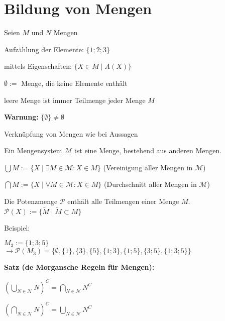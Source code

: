 \section*{Bildung von Mengen}
Seien $M$ und $N$ Mengen
\begin{compactitem}
	\item Aufzählung der Elemente: $\{1;2;3\}$
	\item mittels Eigenschaften: $\{X \in M \mid A(X)\}$
	\item $\emptyset:=$ Menge, die keine Elemente enthält
	\begin{compactitem}
		\item leere Menge ist immer Teilmenge jeder Menge $M$
		\item \textbf{Warnung:} $\{\emptyset\} \neq \emptyset$
	\end{compactitem}
	\item Verknüpfung von Mengen wie bei Aussagen
\end{compactitem}

\begin{mydef}[Mengensystem]
	Ein Mengensystem $\mathcal M$ ist eine Menge, bestehend aus anderen Mengen.
	\begin{compactitem}
		\item $\bigcup M := \{X \mid \exists M \in \mathcal M: X \in M\}$ (Vereinigung aller Mengen in 
		$\mathcal M$)
		\item $\bigcap M := \{X \mid \forall M \in \mathcal M: X \in M\}$ (Durchschnitt aller Mengen in 
		$\mathcal M$)
	\end{compactitem}
\end{mydef}

\begin{mydef}[Potenzmenge]
	Die Potenzmenge $\mathcal P$ enth\"alt alle Teilmengen einer Menge $M$. \\
	$\mathcal P(X) := \{\tilde M \mid \tilde M \subset M\}$ 
\end{mydef}

Beispiel:
\begin{compactitem}
	\item $M_3 := \{1;3;5\}$ \\
	$\to \mathcal P(M_3) = \{\emptyset, \{1\}, \{3\}, \{5\}, \{1;3\}, \{1;5\}, \{3;5\}, \{1;3;5\}\}$
\end{compactitem}

\begin{framed}
	\textbf{Satz (de Morgansche Regeln f\"ur Mengen):}
	\begin{compactitem}
		\item $(\mathop{\bigcup}_{N \in \mathcal N} N)^C = \mathop{\bigcap}_{N \in \mathcal N} N^C$ 
		\item $(\mathop{\bigcap}_{N \in \mathcal N} N)^C = \mathop{\bigcup}_{N \in \mathcal N} N^C$ 
	\end{compactitem}
\end{framed}

